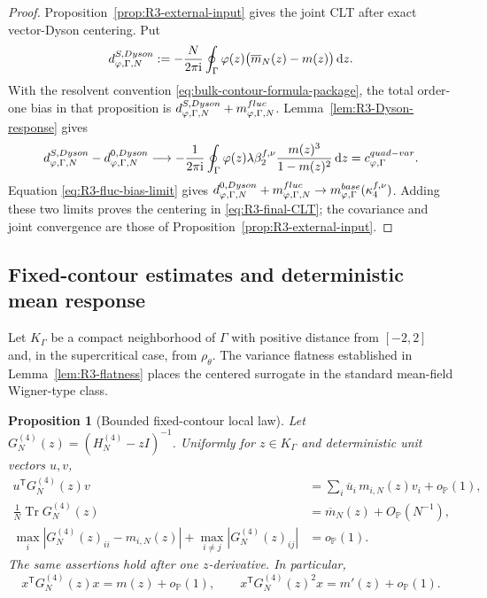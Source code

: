 \documentclass[10pt,a4paper]{amsart}
\newtheorem{proposition}[theorem]{Proposition}
\newcommand{\Tr}{\operatorname{Tr}}
\newcommand{\ii}{\mathrm i}
\newcommand{\dd}{\mathrm d}
\begin{document}
\begin{proof}
Proposition~\ref{prop:R3-external-input} gives the joint CLT after exact
vector-Dyson centering.  Put
\[
 d_{\varphi,\Gamma,N}^{S,\rm Dyson}
 :=-\frac{N}{2\pi\ii}\oint_\Gamma
 \varphi(z)\bigl(\overline m_N(z)-m(z)\bigr)\,\dd z.
\]
With the resolvent convention \eqref{eq:bulk-contour-formula-package}, the
total order-one bias in that proposition is
\(d_{\varphi,\Gamma,N}^{S,\rm Dyson}
+m_{\varphi,\Gamma,N}^{\rm fluc}\).  Lemma~\ref{lem:R3-Dyson-response}
gives
\[
 d_{\varphi,\Gamma,N}^{S,\rm Dyson}
 -d_{\varphi,\Gamma,N}^{0,\rm Dyson}
 \longrightarrow
 -\frac1{2\pi\ii}\oint_\Gamma\varphi(z)
 \lambda\beta_2^{f,\nu}\frac{m(z)^3}{1-m(z)^2}\,\dd z
 =c_{\varphi,\Gamma}^{\rm quad-var}.
\]
Equation \eqref{eq:R3-fluc-bias-limit} gives
\(d_{\varphi,\Gamma,N}^{0,\rm Dyson}
+m_{\varphi,\Gamma,N}^{\rm fluc}
\to m_{\varphi,\Gamma}^{\rm base}(\kappa_4^{f,\nu})\).  Adding these two limits proves the
centering in \eqref{eq:R3-final-CLT}; the covariance and joint convergence
are those of Proposition~\ref{prop:R3-external-input}.
\end{proof}


\subsection{Fixed-contour estimates and deterministic mean response}
\label{sec:R4-package}

Let \(K_\Gamma\) be a compact neighborhood of \(\Gamma\) with positive
distance from \([-2,2]\) and, in the supercritical case, from
\(\rho_\theta\).  The variance flatness established in
Lemma~\ref{lem:R3-flatness} places the centered surrogate in the standard
mean-field Wigner-type class.

\begin{proposition}[Bounded fixed-contour local law]
\label{prop:R4-bounded-local-law}
Let \(G_N^{(4)}(z)=(H_N^{(4)}-zI)^{-1}\).  Uniformly for \(z\in K_\Gamma\)
and deterministic unit vectors \(u,v\),
\begin{align}
 u^{\mathsf T}G_N^{(4)}(z)v
 &=
 \sum_i\overline u_i\,m_{i,N}(z)v_i+o_{\mathbb P}(1),
 \label{eq:R4-anisotropic}\\
 \frac1N\Tr G_N^{(4)}(z)&=\overline m_N(z)+O_{\mathbb P}(N^{-1}),
 \label{eq:R4-averaged}\\
 \max_i|G_N^{(4)}(z)_{ii}-m_{i,N}(z)|
 +\max_{i\ne j}|G_N^{(4)}(z)_{ij}|
 &=o_{\mathbb P}(1).
 \label{eq:R4-entrywise}
\end{align}
The same assertions hold after one \(z\)-derivative.  In particular,
\begin{equation}\label{eq:R4-x-law}
 x^{\mathsf T}G_N^{(4)}(z)x=m(z)+o_{\mathbb P}(1),
 \qquad
 x^{\mathsf T}G_N^{(4)}(z)^2x=m'(z)+o_{\mathbb P}(1).
\end{equation}
\end{proposition}
\end{document}
